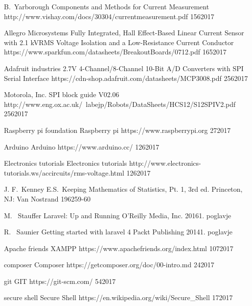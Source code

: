 \documentclass[12pt,a4paper,titlepage,openany]{report}
\begin{document}
 \begin{thebibliography}{99}
\thispagestyle{fancy}

\spletniVirZAvtorjem
    {B.~Yarborough}
    {Components and Methods for Current Measurement}
    {http://www.vishay.com/docs/30304/currentmeasurement.pdf}
    {15}{6}{2017}

\spletniVirZAvtorjem
    {Allegro Microsystems}
    {Fully Integrated, Hall Effect-Based Linear Current Sensor with 2.1 kVRMS Voltage Isolation and a Low-Resistance Current Conductor}
    {https://www.sparkfun.com/datasheets/BreakoutBoards/0712.pdf}
    {16}{5}{2017}

\spletniVirZAvtorjem
    {Adafruit industries}
    {2.7V 4-Channel/8-Channel 10-Bit A/D Converters with SPI Serial Interface}
    {https://cdn-shop.adafruit.com/datasheets/MCP3008.pdf}
    {25}{6}{2017}

\spletniVirZAvtorjem
    {Motorola, Inc.}
    {SPI block guide V02.06}
    {http://www.eng.ox.ac.uk/~labejp/Robots/DataSheets/HCS12/S12SPIV2.pdf}
    {25}{6}{2017}


\spletniVirZAvtorjem
    {Raspberry pi foundation}
    {Raspberry pi}
    {https://www.raspberrypi.org}
    {2}{7}{2017}

\spletniVirZAvtorjem
    {Arduino}
    {Arduino}
    {https://www.arduino.cc/}
    {12}{6}{2017}


\spletniVirZAvtorjem
    {Electronics tutorials}
    {Electronics tutorials}
    {http://www.electronics-tutorials.ws/accircuits/rms-voltage.html}
    {12}{6}{2017}


  \clanekVRevijiVecAvtorjev
    {J. F.~Kenney }{E.S.~Keeping}
    {Mathematics of Statistics, Pt. 1, 3rd ed.}
   { Princeton, NJ: Van Nostrand}
   {1962}{59-60}

  \clanekVRevijiVecAvtorjev
    {M.~ Stauffer}
    {Laravel: Up and Running}
   {O'Reilly Media, Inc.}
   {2016}{1. poglavje}


  \clanekVRevijiVecAvtorjev
    {R.~ Saunier}
    {Getting started with laravel 4}
   {Packt Publishing}
   {2014}{1. poglavje}

\spletniVirZAvtorjem
    {Apache friends}
    {XAMPP}
    {https://www.apachefriends.org/index.html}
    {10}{7}{2017}

\spletniVirZAvtorjem
    {composer}
    {Composer}
    {https://getcomposer.org/doc/00-intro.md}
    {2}{4}{2017}

\spletniVirZAvtorjem
    {git}
    {GIT}
    {https://git-scm.com/}
    {5}{4}{2017}

\spletniVirZAvtorjem
    {secure shell}
    {Secure Shell}
    {https://en.wikipedia.org/wiki/Secure\_Shell}
    {1}{7}{2017}




\end{thebibliography}
\newpage
\end{document}
